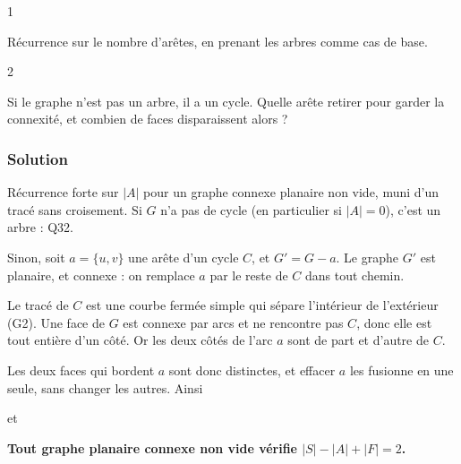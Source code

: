 \documentclass[11pt,a4paper]{article}
\newcommand{\equationajustee}[1]{%
  \sbox{\boiteequation}{$\displaystyle #1$}%
  \ifdim\wd\boiteequation>\linewidth
    \[\resizebox{\linewidth}{!}{\usebox{\boiteequation}}\]%
  \else
    \[#1\]%
  \fi}
\begin{document}
\begin{indication}{1}

Récurrence sur le nombre d'arêtes, en prenant les arbres comme cas de base.

\end{indication}

\begin{indication}{2}

Si le graphe n'est pas un arbre, il a un cycle. Quelle arête retirer pour garder la connexité, et combien de faces disparaissent alors ?

\end{indication}

\hypertarget{solution-32}{%
\subsubsection{Solution}\label{solution-32}}

Récurrence forte sur \(|A|\) pour un graphe connexe planaire non vide, muni d'un tracé sans croisement. Si \(G\) n'a pas de cycle (en particulier si \(|A| = 0\)), c'est un arbre : Q32.

Sinon, soit \(a = \{u, v\}\) une arête d'un cycle \(C\), et \(G' = G - a\). Le graphe \(G'\) est planaire, et connexe : on remplace \(a\) par le reste de \(C\) dans tout chemin.

Le tracé de \(C\) est une courbe fermée simple qui sépare l'intérieur de l'extérieur (G2). Une face de \(G\) est connexe par arcs et ne rencontre pas \(C\), donc elle est tout entière d'un côté. Or les deux côtés de l'arc \(a\) sont de part et d'autre de \(C\).

Les deux faces qui bordent \(a\) sont donc distinctes, et effacer \(a\) les fusionne en une seule, sans changer les autres. Ainsi

\equationajustee{\begin{aligned}
|S'| &= |S| \\
|A'| &= |A| - 1 \\
|F'| &= |F| - 1
\end{aligned}}

et

\equationajustee{\begin{aligned}
|S| - |A| + |F| &= |S'| - |A'| + |F'| \\
&= 2.
\end{aligned}}

\textbf{Tout graphe planaire connexe non vide vérifie \(|S| - |A| + |F| = 2\).}
\end{document}
